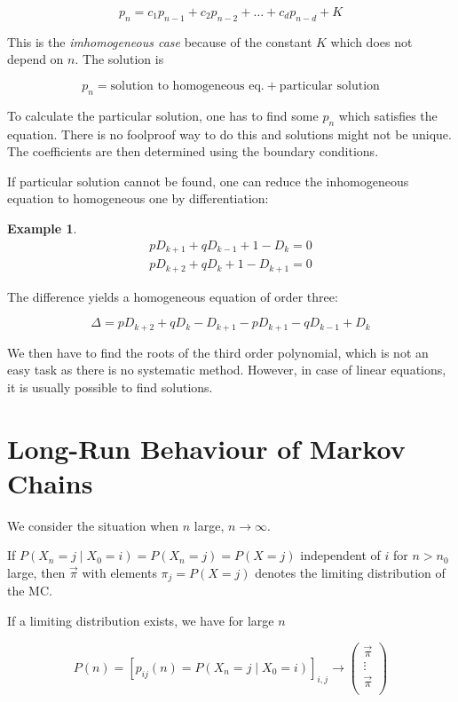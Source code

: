 \documentclass{article}
\theoremstyle{definition}
\newtheorem{exmp}{Example}[section]
\begin{document}
$$
p_n = c_1 p_{n-1} + c_2 p_{n-2} + \ldots + c_d p_{n-d} + K 
$$

This is the \emph{imhomogeneous case} because of the constant $K$ which does not depend on $n$.
The solution is

$$
p_n = \text{solution to homogeneous eq.} + \text{particular solution}
$$

To calculate the particular solution, one has to find some $p_n$ which satisfies the equation. There is no foolproof way to do this and solutions might not be unique. The coefficients are then determined using the boundary conditions. 

If particular solution cannot be found, one can reduce the inhomogeneous equation to homogeneous one by differentiation:

\begin{exmp}

\begin{align*}
p D_{k+1} + q D_{k-1} + 1 - D_k = 0 \\
p D_{k+2} + q D_k + 1 - D_{k+1} = 0
\end{align*}

The difference yields a homogeneous equation of order three:

$$
\Delta = p D_{k+2} + q D_k - D_{k+1} - p D_{k+1} - q D_{k-1} + D_k
$$
\end{exmp}

We then have to find the roots of the third order polynomial, which is not an easy task as there is no systematic method. However, in case of linear equations, it is usually possible to find solutions. 

\section{Long-Run Behaviour of Markov Chains}
We consider the situation when $n$ large, $n \to \infty$.

If 
$P \left( X_n = j \mid X_0 = i \right) = P \left( X_n = j \right) = P(X = j)$ independent of $i$ for $n > n_0$ large, then $\vec{\pi}$ with elements $\pi_j = P(X = j)$ denotes the limiting distribution of the MC.

If a limiting distribution exists, we have for large $n$

$$
P(n) = \left[ p_{ij}(n) = P(X_n=j \mid X_0 = i)  \right]_{i,j} \to \begin{pmatrix} \vec{\pi} \\ \vdots \\ \vec{\pi} \\ \end{pmatrix}
$$
\end{document}
